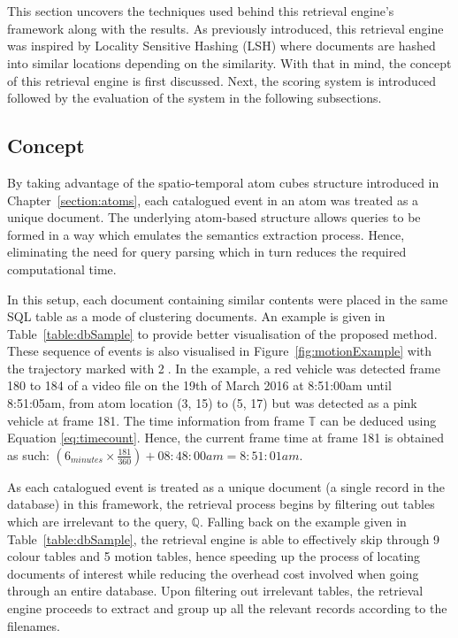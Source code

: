 \section{\versionOneRet}
\label{section:versionOne}
This section uncovers the techniques used behind this retrieval engine's
framework along with the results. As previously introduced, this retrieval
engine was inspired by Locality Sensitive Hashing (LSH) where documents are
hashed into similar locations depending on the similarity. With that in mind,
the concept of this retrieval engine is first discussed. Next, the scoring
system is introduced followed by the evaluation of the system in the
following subsections.

\subsection{Concept}
\label{versionOneConcept}
By taking advantage of the spatio-temporal atom cubes structure introduced in
Chapter~\ref{section:atoms}, each catalogued event in an atom was treated as a
unique document. The underlying atom-based structure allows queries to be
formed in a way which emulates the semantics extraction process. Hence,
eliminating the need for query parsing which in turn reduces the required
computational time.

In this setup, each document containing similar contents were placed in the
same SQL table as a mode of clustering documents. An example is given in
Table~\ref{table:dbSample} to provide better visualisation of the proposed
method. These sequence of events is also visualised in
Figure~\ref{fig:motionExample} with the trajectory marked with \textcircled{2}.
In the example, a red vehicle was detected frame 180 to 184 of a video file on
the 19th of March 2016 at 8:51:00am until 8:51:05am, from atom location (3, 15)
to (5, 17) but was detected as a pink vehicle at frame 181.
The time information from frame $\mathbb{T}$ can be deduced using Equation \ref{eq:timecount}.
Hence, the
current frame time at frame 181 is obtained as such:
$(6_{minutes} \times \frac{181}{360}) + 08:48:00am = 8:51:01am$.

As each catalogued event is treated as a unique document (a single record in
the database) in this framework, the retrieval process begins by filtering out
tables which are irrelevant to the query, $\mathbb{Q}$. Falling back on the
example given in Table~\ref{table:dbSample}, the retrieval engine is able to effectively
skip through 9 colour tables and 5 motion tables, hence speeding up the process
of locating documents of interest while reducing the overhead cost involved
when going through an entire database. Upon filtering out irrelevant tables,
the retrieval engine proceeds to extract and group up all the relevant records
according to the filenames.

